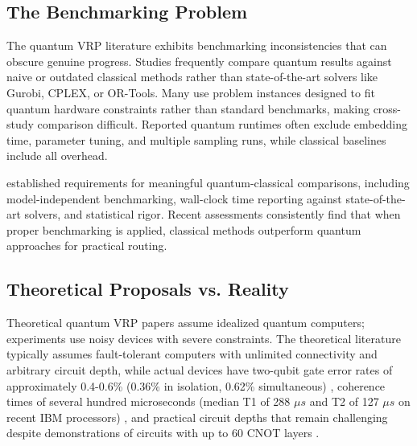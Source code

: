 \documentclass[preprint,3p,12pt,authoryear]{elsarticle}
\begin{document}
\subsection{The Benchmarking Problem}

The quantum VRP literature exhibits benchmarking inconsistencies that can obscure genuine progress. Studies frequently compare quantum results against naive or outdated classical methods rather than state-of-the-art solvers like Gurobi, CPLEX, or OR-Tools. Many use problem instances designed to fit quantum hardware constraints rather than standard benchmarks, making cross-study comparison difficult. Reported quantum runtimes often exclude embedding time, parameter tuning, and multiple sampling runs, while classical baselines include all overhead.

\citet{abbas2024challenges} established requirements for meaningful quantum-classical comparisons, including model-independent benchmarking, wall-clock time reporting against state-of-the-art solvers, and statistical rigor. Recent assessments \citep{yarkoni2022quantum, osaba2024hybrid} consistently find that when proper benchmarking is applied, classical methods outperform quantum approaches for practical routing.

\subsection{Theoretical Proposals vs. Reality}

Theoretical quantum VRP papers assume idealized quantum computers; experiments use noisy devices with severe constraints. The theoretical literature typically assumes fault-tolerant computers with unlimited connectivity and arbitrary circuit depth, while actual devices have two-qubit gate error rates of approximately 0.4-0.6\% (0.36\% in isolation, 0.62\% simultaneous) \citep{arute2019quantum}, coherence times of several hundred microseconds (median T1 of 288 $\mu s$ and T2 of 127 $\mu s$ on recent IBM processors) \citep{kim2023evidence}, and practical circuit depths that remain challenging despite demonstrations of circuits with up to 60 CNOT layers \citep{kim2023evidence}.
\end{document}
